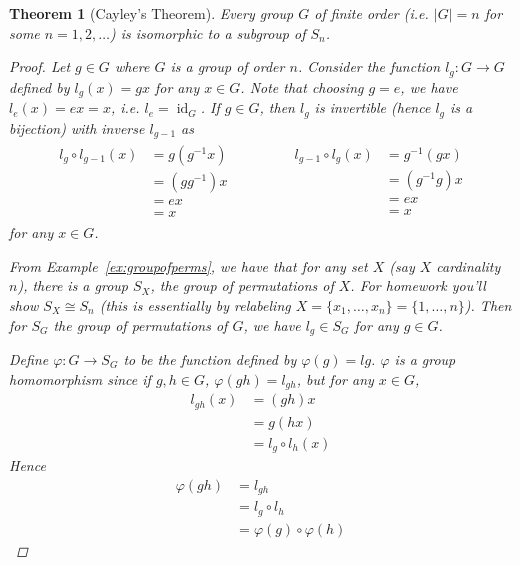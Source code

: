 \documentclass[12pt,letterpaper,DIV=11,final]{scrartcl}
\theoremstyle{plain}
\newtheorem{theorem}{Theorem}[section]
\theoremstyle{definition}
\theoremstyle{remark}
\DeclareMathOperator{\id}{id}
\begin{document}
\begin{theorem}[Cayley's Theorem]\label{thm:cayleystheorem}
  Every group $G$ of finite order (i.e. $|G| = n$ for some $n = 1, 2, \dots$) is isomorphic to a subgroup of $S_n$.

  \begin{proof}
    Let $g \in G$ where $G$ is a group of order $n$.
    Consider the function $l_g : G \to G$ defined by $l_g(x) = gx$ for any $x \in G$.
    Note that choosing $g = e$, we have $l_e(x) = ex = x$, i.e. $l_e = \id_G$.
    If $g \in G$, then $l_g$ is invertible (hence $l_g$ is a bijection) with inverse $l_{g - 1}$ as
    \begin{align*}
      \begin{aligned}
        l_g \circ l_{g - 1}(x) &= g(g^{-1} x) \\
                               &= (g g^{-1}) x \\
                               &= ex \\
                               &= x
      \end{aligned}
      \qquad \qquad
      \begin{aligned}
        l_{g - 1} \circ l_g(x) &= g^{-1}(gx) \\
                               &= (g^{-1} g) x \\
                               &= ex \\
                               &= x
      \end{aligned}
    \end{align*}
    for any $x \in G$.

    From Example~\ref{ex:groupofperms}, we have that for any set $X$ (say $X$ cardinality $n$), there is a group $S_X$, the group of permutations of $X$.
    For homework you'll show $S_X \cong S_n$ (this is essentially by relabeling $X = \{ x_1, \dots, x_n \} = \{ 1, \dots, n \}$).
    Then for $S_G$ the group of permutations of $G$, we have $l_g \in S_G$ for any $g \in G$.

    Define $\varphi : G \to S_G$ to be the function defined by $\varphi(g) = l g$.
    $\varphi$ is a group homomorphism since if $g, h \in G$, $\varphi(gh) = l_{gh}$, but for any $x \in G$,
    \begin{align*}
      l_{gh}(x) &= (gh) x \\
                &= g(hx) \\
                &= l_g \circ l_h (x)
    \end{align*}
    Hence
    \begin{align*}
      \varphi(gh) &= l_{gh} \\
                  &= l_g \circ l_h \\
                  &= \varphi(g) \circ \varphi(h)
    \end{align*}


\end{proof}
\end{theorem}
\end{document}

